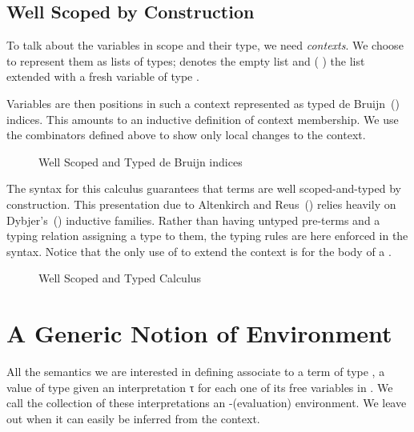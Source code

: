 \subsection{Well Scoped by Construction}

To talk about the variables in scope and their type, we need \emph{contexts}. We
choose to represent them as lists of types; \AIC{[]} denotes the empty list and
(  ) the list  extended with a fresh variable of type .


\begin{figure}[h]
\caption{\label{fig:scoped}}
\end{figure}


Variables are then positions in such a context represented as typed de
Bruijn~(\citeyear{de1972lambda}) indices. This amounts to an inductive definition
of context membership. We use the combinators defined above to show only local
changes to the context.

\begin{figure}[h]
\caption{Well Scoped and Typed de Bruijn indices\label{fig:variable}}
\end{figure}

The syntax for this calculus guarantees that terms are well scoped-and-typed
by construction. This presentation due to
Altenkirch and Reus~(\citeyear{altenkirch1999monadic}) relies heavily on
Dybjer's~(\citeyear{dybjer1991inductive}) inductive families. Rather than
having untyped pre-terms and a typing relation assigning a type to
them, the typing rules are here enforced in the syntax. Notice that
the only use of  to extend the context is for the body of
a .

\begin{figure}[h]
\caption{Well Scoped and Typed Calculus\label{fig:term}}
\end{figure}

\section{A Generic Notion of Environment}

All the semantics we are interested in defining associate to a term 
of type   , a value of type    given
an interpretation   {τ} for each one of its free variables
 in . We call the collection of these interpretations an
-(evaluation) environment. We leave out  when it can easily
be inferred from the context.

